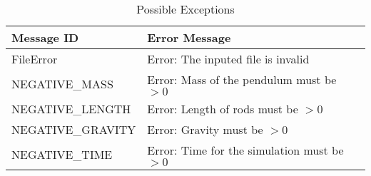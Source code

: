 \documentclass[12pt, titlepage]{article}
\begin{document}
\begin{longtable}{l p{12cm}}
\caption{Possible Exceptions} \\
\toprule
\textbf{Message ID} & \textbf{Error Message} \\
\midrule
FileError & Error: The inputed file is invalid\\
NEGATIVE\_MASS & Error: Mass of the pendulum must be $> 0$ \\
NEGATIVE\_LENGTH & Error: Length of rods must be $> 0$ \\
NEGATIVE\_GRAVITY & Error: Gravity must be $> 0$\\
NEGATIVE\_TIME& Error: Time for the simulation must be $> 0$ \\

\bottomrule
\end{longtable}
\end{document}
